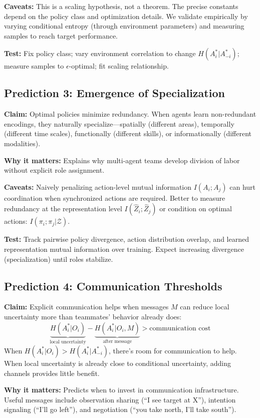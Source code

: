 \documentclass[10pt, letterpaper]{article}
\begin{document}
\textbf{Caveats:} This is a scaling hypothesis, not a theorem. The precise constants depend on the policy class and optimization details. We validate empirically by varying conditional entropy (through environment parameters) and measuring samples to reach target performance.

\textbf{Test:} Fix policy class; vary environment correlation to change $H(A_i^*|A_{-i}^*)$; measure samples to $\epsilon$-optimal; fit scaling relationship.

\subsection{Prediction 3: Emergence of Specialization}

\textbf{Claim:} Optimal policies minimize redundancy. When agents learn non-redundant encodings, they naturally specialize---spatially (different areas), temporally (different time scales), functionally (different skills), or informationally (different modalities).

\textbf{Why it matters:} Explains why multi-agent teams develop division of labor without explicit role assignment.

\textbf{Caveats:} Naively penalizing action-level mutual information $I(A_i; A_j)$ can hurt coordination when synchronized actions are required. Better to measure redundancy at the representation level $I(\hat{Z}_i; \hat{Z}_j)$ or condition on optimal actions: $I(\pi_i; \pi_j | \mathcal{Z})$.

\textbf{Test:} Track pairwise policy divergence, action distribution overlap, and learned representation mutual information over training. Expect increasing divergence (specialization) until roles stabilize.

\subsection{Prediction 4: Communication Thresholds}

\textbf{Claim:} Explicit communication helps when messages $M$ can reduce local uncertainty more than teammates' behavior already does:
\[\underbrace{H(A_i^* | O_i)}_{\text{local uncertainty}} - \underbrace{H(A_i^* | O_i, M)}_{\text{after message}} > \text{communication cost}\]
When $H(A_i^*|O_i) > H(A_i^*|A_{-i}^*)$, there's room for communication to help. When local uncertainty is already close to conditional uncertainty, adding channels provides little benefit.

\textbf{Why it matters:} Predicts when to invest in communication infrastructure. Useful messages include observation sharing (``I see target at X''), intention signaling (``I'll go left''), and negotiation (``you take north, I'll take south'').
\end{document}
